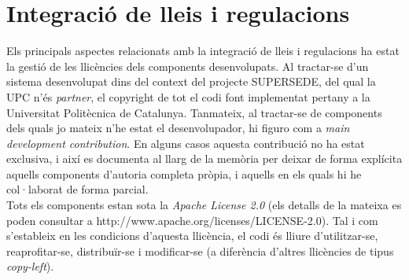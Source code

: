 
\chapter{Integració de lleis i regulacions} %

\label{IntegracioLleisRegulacions} %

Els principals aspectes relacionats amb la integració de lleis i regulacions ha estat la gestió de les llicències dels components desenvolupats. Al tractar-se d'un sistema desenvolupat dins del context del projecte SUPERSEDE, del qual la UPC n'és \textit{partner}, el copyright de tot el codi font implementat pertany a la Universitat Politècnica de Catalunya. Tanmateix, al tractar-se de components dels quals jo mateix n'he estat el desenvolupador, hi figuro com a \textit{main development contribution}. En alguns casos aquesta contribució no ha estat exclusiva, i així es documenta al llarg de la memòria per deixar de forma explícita aquells components d'autoria completa pròpia, i aquells en els quals hi he col·laborat de forma parcial.\\ 

Tots els components estan sota la \textit{Apache License 2.0} (els detalls de la mateixa es poden consultar a http://www.apache.org/licenses/LICENSE-2.0). Tal i com s'estableix en les condicions d'aquesta llicència, el codi és lliure d'utilitzar-se, reaprofitar-se, distribuïr-se i modificar-se (a diferència d'altres llicències de tipus \textit{copy-left}).